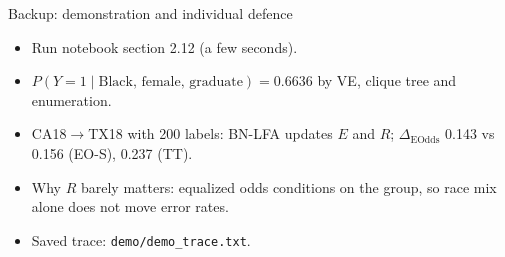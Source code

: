 \documentclass[aspectratio=169,11pt]{beamer}
\newcommand{\EO}{\Delta_{\mathrm{EOdds}}}
\begin{document}
\begin{frame}{Backup: demonstration and individual defence}
\begin{itemize}
\item Run notebook section 2.12 (a few seconds).
\item $P(Y{=}1\mid\text{Black, female, graduate}) = 0.6636$ by VE, clique tree and enumeration.
\item CA18$\to$TX18 with 200 labels: BN-LFA updates $E$ and $R$; $\EO$ 0.143 vs 0.156 (EO-S), 0.237 (TT).
\item Why $R$ barely matters: equalized odds conditions on the group, so race mix alone does not move error rates.
\item Saved trace: \texttt{demo/demo\_trace.txt}.
\end{itemize}
\end{frame}
\end{document}
